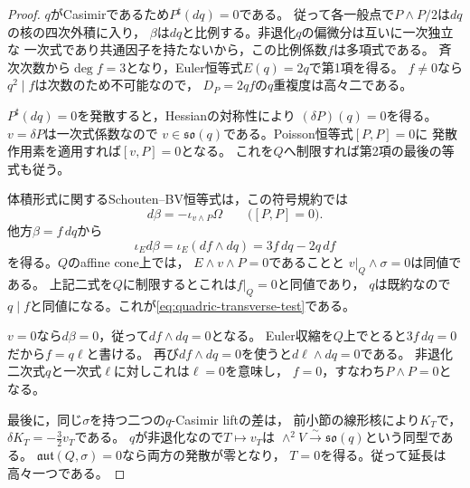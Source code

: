 \documentclass[a4paper,11pt]{ltjsarticle}
\theoremstyle{definition}
\theoremstyle{definition}\newtheorem{definition}[theorem]{定義}
\theoremstyle{remark}\newtheorem{remark}[theorem]{注意}
\begin{document}
\begin{proof}
$q$がCasimirであるため$P^\sharp(dq)=0$である。
従って各一般点で$P\wedge P/2$は$dq$の核の四次外積に入り，
$\beta$は$dq$と比例する。非退化$q$の偏微分は互いに一次独立な
一次式であり共通因子を持たないから，この比例係数$f$は多項式である。
斉次次数から$\deg f=3$となり，Euler恒等式$E(q)=2q$で第1項を得る。
$f\ne0$なら$q^2\mid f$は次数のため不可能なので，
$D_P=2qf$の$q$重複度は高々二である。

$P^\sharp(dq)=0$を発散すると，Hessianの対称性により
$(\delta P)(q)=0$を得る。$v=\delta P$は一次式係数なので
$v\in\mathfrak{so}(q)$である。Poisson恒等式$[P,P]=0$に
発散作用素を適用すれば$[v,P]=0$となる。
これを$Q$へ制限すれば第2項の最後の等式も従う。

体積形式に関するSchouten--BV恒等式は，この符号規約では
\[
 d\beta=-\iota_{v\wedge P}\Omega
 \qquad\bigl([P,P]=0\bigr).
\]
他方$\beta=f\,dq$から
\[
 \iota_Ed\beta=\iota_E(df\wedge dq)
             =3f\,dq-2q\,df
\]
を得る。$Q$のaffine cone上では，
$E\wedge v\wedge P=0$であることと
$v|_Q\wedge\sigma=0$は同値である。
上記二式を$Q$に制限するとこれは$f|_Q=0$と同値であり，
$q$は既約なので$q\mid f$と同値になる。これが\eqref{eq:quadric-transverse-test}である。

$v=0$なら$d\beta=0$，従って$df\wedge dq=0$となる。
Euler収縮を$Q$上でとると$3f\,dq=0$だから$f=q\ell$と書ける。
再び$df\wedge dq=0$を使うと$d\ell\wedge dq=0$である。
非退化二次式$q$と一次式$\ell$に対しこれは$\ell=0$を意味し，
$f=0$，すなわち$P\wedge P=0$となる。

最後に，同じ$\sigma$を持つ二つの$q$-Casimir liftの差は，
前小節の線形核により$K_T$で，$\delta K_T=-\frac32v_T$である。
$q$が非退化なので$T\mapsto v_T$は
$\wedge^2V\xrightarrow{\sim}\mathfrak{so}(q)$という同型である。
$\mathfrak{aut}(Q,\sigma)=0$なら両方の発散が零となり，
$T=0$を得る。従って延長は高々一つである。
\end{proof}
\end{document}
